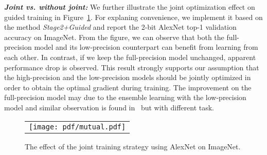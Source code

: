 \vspace{1mm}
\noindent\textbf{{\emph{Joint vs. without joint:}}}
We further illustrate the joint optimization effect on guided training in Figure~\ref{fig:mutual}. For explaning convenience, we implement it based on the method \emph{Stage2+Guided} and report the 2-bit AlexNet top-1 validation accuracy on ImageNet. From the figure, we can observe that both the full-precision model and its low-precision counterpart can benefit from learning from each other. In contrast, if we keep the full-precision model unchanged, apparent performance drop is observed. This result strongly supports our assumption that the high-precision and the low-precision models should be jointly optimized in order to obtain the optimal gradient during training. The improvement on the full-precision model may due to the ensemble learning with the low-precision model and similar observation is found in~\cite{zhang2017deep} but with different task.
\begin{figure}[!htb]
	\centering
	\resizebox{0.9\linewidth}{!}
	{
		\begin{tabular}{c}
			\texttt{[image: pdf/mutual.pdf]}
		\end{tabular}
	}
	\caption{The effect of the joint training strategy using AlexNet on ImageNet.}
	\label{fig:mutual}
\end{figure}


%
%
%
%
%
%
%
%
%
%
%
%
%
%



